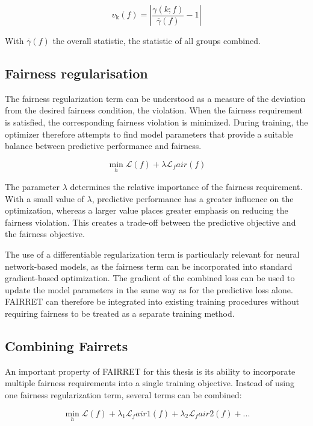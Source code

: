 \begin{equation}
    v_{\mathrm{k}}(f)
    =
    \left|
    \frac{{\gamma}(k; f)}{\overline{{\gamma}}(f)} - 1
    \right|
    \label{eq}
\end{equation}

With $\overline{{\gamma}}(f)$ the overall statistic, the statistic of all groups combined.

\subsection{Fairness regularisation}
The fairness regularization term can be understood as a measure of the deviation from the desired fairness condition, the violation. When the fairness requirement is satisfied, the corresponding fairness violation is minimized. During training, the optimizer therefore attempts to find model parameters that provide a suitable balance between predictive performance and fairness.

\[
\min_h \mathcal{L}(f) + \lambda \mathcal{L}_fair(f)
\]

The parameter $\lambda$ determines the relative importance of the fairness requirement. With a small value of $\lambda$, predictive performance has a greater influence on the optimization, whereas a larger value places greater emphasis on reducing the fairness violation. This creates a trade-off between the predictive objective and the fairness objective.

The use of a differentiable regularization term is particularly relevant for neural network-based models, as the fairness term can be incorporated into standard gradient-based optimization. The gradient of the combined loss can be used to update the model parameters in the same way as for the predictive loss alone. FAIRRET can therefore be integrated into existing training procedures without requiring fairness to be treated as a separate training method.

\subsection{Combining Fairrets}
An important property of FAIRRET for this thesis is its ability to incorporate multiple fairness requirements into a single training objective. Instead of using one fairness regularization term, several terms can be combined:

\[
\min_h \mathcal{L}(f) + \mathcal{\lambda}_1 \mathcal{L}_fair1(f) + \mathcal{\lambda}_2 \mathcal{L}_fair2(f) + ...
\]


